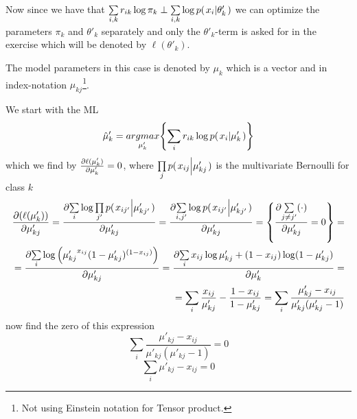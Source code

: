 \documentclass[a4paper,twoside=false,abstract=false,numbers=noenddot,
titlepage=false,headings=small,parskip=half,version=last]{scrartcl}
\begin{document}
\begin{solution}
    Now since we have that $\sum\limits_{i,k}r_{ik}\log\pi_k \perp
    \sum\limits_{i,k}\log p{(\left. x_i \middle\vert \theta'_k \right.)}$ we can optimize the parameters
    $\pi_k$ and $\theta'_k$ separately and only the $\theta'_k$-term is asked for in the
    exercise which will be denoted by $\ell(\theta'_k)$.

    The model parameters in this case is denoted by $\mu_k$ which is a vector
    and in index-notation $\mu_{kj}$\footnote{Not using Einstein notation for
    Tensor product.}.

    We start with the ML
    \begin{equation}
        \hat{\mu}'_k = \underset{\mu'_k}{argmax}{\left\{\sum\limits_i
        r_{ik}\log p{(\left. x_i \middle\vert \mu'_k \right.)}\right\}}
    \end{equation}
    which we find by $\frac{\partial{\ell(\mu'_k)}}{\partial{\mu'_k}}=0$, where 
    $\prod\limits_j p{(\left. x_{ij} \middle\vert \mu'_{kj} \right.)}$ 
    is the multivariate Bernoulli for class $k$
    \begin{eqnarray}
        \frac{\partial{
            \left(
            \ell(\mu'_k)
            \right)
        }}{\partial{
            \mu'_{kj}
        }} = 
        \frac{\partial{
            \sum\limits_i\log \prod\limits_{j'} p{(\left. x_{ij'} \middle\vert \mu'_{kj'} \right.)}
        }}{\partial{
            \mu'_{kj} 
        }}=
        \frac{\partial{
        \sum\limits_{i,j'}\log p{(\left. x_{ij'} \middle\vert \mu'_{kj'} \right.)} 
        }}{\partial{
            \mu'_{kj}
        }}= \left\{
            \frac{\partial{
                \sum\limits_{j\neq j'} (\cdot)
            }}{\partial{
                \mu'_{kj}
            }} = 0
            \right\}  = \\
        =
        \frac{\partial{
            \sum\limits_{i}\log \left(
                {\mu'_{kj}}^{x_{ij}}
                (1-{\mu'_{kj}})^{(1-x_{ij})}
            \right)
        }}{\partial{
            \mu'_{kj}
        }}
        =
        \frac{\partial{
            \sum\limits_{i} x_{ij}\log{\mu'_{kj}} + (1-x_{ij})\log({1-\mu'_{kj}})
        }}{\partial{
            \mu'_k  
        }} = \\
        = \sum\limits_{i} \frac{x_{ij}}{\mu'_{kj}} -
        \frac{1-x_{ij}}{1-\mu'_{kj}} =
        \sum\limits_i \frac{
            \mu'_{kj} - x_{ij}
        }
        {
            \mu'_{kj}(\mu'_{kj}-1)    
        }
    \end{eqnarray}
    now find the zero of this expression
    \begin{equation}
         \sum\limits_i \frac{
            \mu'_{kj} - x_{ij}
        }
        {
            \mu'_{kj}(\mu'_{kj}-1)    
        } = 0
    \end{equation}
    \begin{equation}
         \sum\limits_i
            \mu'_{kj} - x_{ij}
         = 0
    \end{equation}


\end{solution}

\end{document}
